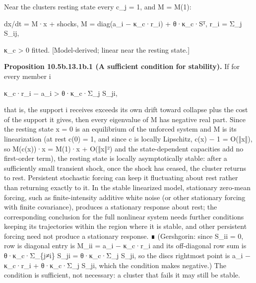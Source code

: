 \documentclass[
]{article}
\begin{document}
Near the cluster\textquotesingle s resting state every c\_j = 1, and M =
M(1):

dx/dt = M·x + shocks, M = diag(a\_i − κ\_c·r\_i) + θ·κ\_c·Sᵀ, r\_i =
Σ\_j S\_ij,

κ\_c \textgreater{} 0 fitted. {[}Model-derived; linear near the resting
state.{]}

\textbf{Proposition 10.5b.13.1b.1 (A sufficient condition for
stability).} If for every member i

κ\_c·r\_i − a\_i \textgreater{} θ·κ\_c·Σ\_j S\_ji,

that is, the support i receives exceeds its own drift toward collapse
plus the cost of the support it gives, then every eigenvalue of M has
negative real part. Since the resting state x = 0 is an equilibrium of
the unforced system and M is its linearization (at rest c(0) = 1, and
since c is locally Lipschitz, c(x) − 1 = O(‖x‖), so M(c(x))·x = M(1)·x +
O(‖x‖²) and the state-dependent capacities add no first-order term), the
resting state is locally asymptotically stable: after a sufficiently
small transient shock, once the shock has ceased, the cluster returns to
rest. Persistent stochastic forcing can keep it fluctuating about rest
rather than returning exactly to it. In the stable linearized model,
stationary zero-mean forcing, such as finite-intensity additive white
noise (or other stationary forcing with finite covariance), produces a
stationary response about rest; the corresponding conclusion for the
full nonlinear system needs further conditions keeping its trajectories
within the region where it is stable, and other persistent forcing need
not produce a stationary response. ∎ (Gershgorin: since S\_ii = 0, row
i\textquotesingle s diagonal entry is M\_ii = a\_i − κ\_c·r\_i and its
off-diagonal row sum is θ·κ\_c·Σ\_\{j≠i\} S\_ji = θ·κ\_c·Σ\_j S\_ji, so
the disc\textquotesingle s rightmost point is a\_i − κ\_c·r\_i +
θ·κ\_c·Σ\_j S\_ji, which the condition makes negative.) The condition is
sufficient, not necessary: a cluster that fails it may still be stable.
\end{document}
